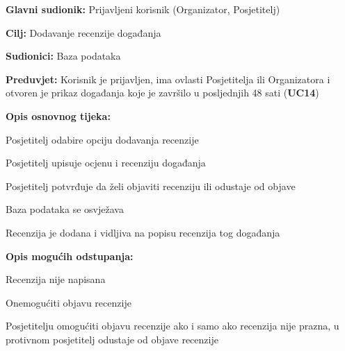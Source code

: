 	
	\noindent {}
	\begin{packed_item}
		
		\item \textbf{Glavni sudionik:} Prijavljeni korisnik (Organizator, Posjetitelj)
		\item  \textbf{Cilj:} Dodavanje recenzije događanja
		\item  \textbf{Sudionici:} Baza podataka
		\item  \textbf{Preduvjet:} Korisnik je prijavljen, ima ovlasti Posjetitelja ili Organizatora i otvoren je prikaz događanja koje je završilo u posljednjih 48 sati (\textbf{UC14})
		\item  \textbf{Opis osnovnog tijeka:}
		
		\item[] \begin{packed_enum}
			
			\item Posjetitelj odabire opciju dodavanja recenzije
			\item Posjetitelj upisuje ocjenu i recenziju događanja
			\item Posjetitelj potvrđuje da želi objaviti recenziju ili odustaje od objave
			\item Baza podataka se osvježava
			\item Recenzija je dodana i vidljiva na popisu recenzija tog događanja
			
		\end{packed_enum}
		
		\item  \textbf{Opis mogućih odstupanja:}
		
		\item[] \begin{packed_item}
			
			\item[2.a] Recenzija nije napisana 
			\item[] \begin{packed_enum}
				
				\item Onemogućiti objavu recenzije 
				\item Posjetitelju omogućiti objavu recenzije ako i samo ako recenzija nije prazna, u protivnom posjetitelj odustaje od objave recenzije
				
			\end{packed_enum}		
		\end{packed_item}
		
	\end{packed_item}
	
